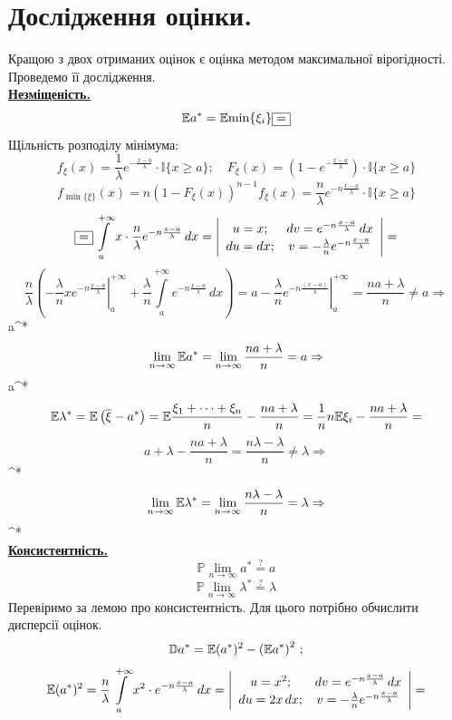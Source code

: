 \documentclass[14pt,a4paper]{scrartcl}
\begin{document}
\newpage
\section{Дослідження оцінки.}
Кращою з двох отриманих оцінок є оцінка методом максимальної вірогідності. Проведемо її дослідження.\\
\underline{\textbf{Незміщеність.}}\\
$$\mathbb{E} {a^*}=\mathbb{E} {\min\{\xi_i\}}\fbox{$=$}$$
Щільність розподілу мінімума:
$$f_\xi(x)=\frac1\lambda e^{-\frac{x-a}\lambda}\cdot\mathbb{I}\{x\geq a\};\quad
F_\xi(x)=(1-e^{-\frac{x-a}\lambda})\cdot\mathbb{I}\{x\geq a\}$$
$$f_{\min\{\xi\}}(x)=n(1-F_\xi(x))^{n-1}f_\xi(x)=
\frac{n}\lambda e^{-n\frac{x-a}{\lambda}}\cdot\mathbb{I}\{x\geq a\}$$
$$\fbox{$=$}\int\limits_{a}^{+\infty}{x\cdot\frac{n}\lambda e^{-n\frac{x-a}{\lambda}}\,dx}=
\left|\begin{array}{cc}
  u=x; & dv=e^{-n\frac{x-a}{\lambda}}\,dx\\
  du=dx; & v=-\frac{\lambda}{n}e^{-n\frac{x-a}{\lambda}}
\end{array}\right|=$$
$$\frac{n}{\lambda}\left(\left.-\frac{\lambda}{n}xe^{-n\frac{x-a}{\lambda}}\right|_a^{+\infty}+\frac{\lambda}{n}\int\limits_{a}^{+\infty}{e^{-n\frac{x-a}{\lambda}}\,dx}\right)=
a-\left.\frac{\lambda}{n}e^{-n\frac{(x-a)}{\lambda}}\right|_a^{+\infty}=
\frac{na+\lambda}n\ne a\Rightarrow$$
\be\Rightarrow a^*\ee
$$\lim\limits_{n\to\infty}{\mathbb{E} a^*}=\lim\limits_{n\to\infty}{\frac{na+\lambda}n}=a\Rightarrow$$
\be\Rightarrow a^*\ee
\\
$$\mathbb{E} \lambda^*=\mathbb{E} \left(\overline{\xi}-a^*\right)=
\mathbb{E} \frac{\xi_1+\dots+\xi_n}n-\frac{na+\lambda}n=
\frac1nn\mathbb{E} \xi_i-\frac{na+\lambda}n=$$
$$a+\lambda-\frac{na+\lambda}n=\frac{n\lambda-\lambda}n\ne\lambda\Rightarrow$$
\be\Rightarrow\lambda^*\ee
$$\lim\limits_{n\to\infty}{\mathbb{E} \lambda^*}=\lim\limits_{n\to\infty}{\frac{n\lambda-\lambda}n}=\lambda\Rightarrow$$
\be\Rightarrow\lambda^*\ee
\newpage\\
\underline{\textbf{Консистентність.}}
$$\mathbb{P}\lim\limits_{n\to\infty}{a^*}\stackrel{?}{=}a$$
$$\mathbb{P}\lim\limits_{n\to\infty}{\lambda^*}\stackrel{?}{=}\lambda$$
Перевіримо за лемою про консистентність. Для цього потрібно обчислити дисперсії оцінок.
$$\mathbb{D} a^*=\mathbb{E} (a^*)^2-\left(\mathbb{E} a^*\right)^2\,;$$
$$\mathbb{E} (a^*)^2=\frac{n}\lambda\int\limits_{a}^{+\infty}{x^2\cdot e^{-n\frac{x-a}\lambda}\,dx}=
\left|\begin{array}{cc}
  u=x^2; & dv=e^{-n\frac{x-a}\lambda}\,dx\\
  du=2x\,dx; & v=-\frac\lambda{n}e^{-n\frac{x-a}\lambda}
\end{array}\right|=$$
\end{document}
